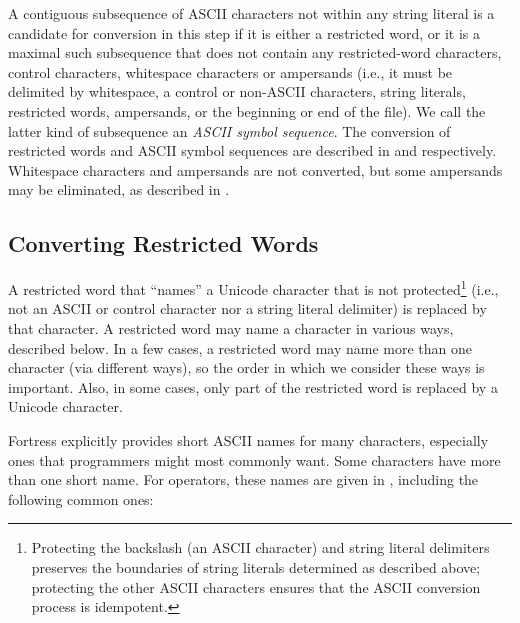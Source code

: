 A contiguous subsequence of ASCII characters
not within any string literal
is a candidate for conversion in this step
if it is either a restricted word,
or it is a maximal such subsequence
that does not contain any restricted-word characters,
control characters,
whitespace characters
or ampersands
(i.e., it must be delimited by whitespace,
a control or non-ASCII characters,
string literals,
restricted words,
ampersands,
or the beginning or end of the file).
We call the latter kind of subsequence
an \emph{ASCII symbol sequence}.
The conversion of restricted words and ASCII symbol sequences
are described in 
and  respectively.
Whitespace characters and ampersands are not converted,
but some ampersands may be eliminated,
as described in .


\subsection{Converting Restricted Words}

A restricted word that ``names'' a Unicode character
that is not protected\footnote{Protecting
the backslash (an ASCII character)
and string literal delimiters
preserves the boundaries of string literals
determined as described above;
protecting the other ASCII characters
ensures that the ASCII conversion process is idempotent.
}
(i.e., not an ASCII or control character
nor a string literal delimiter)
is replaced by that character.
A restricted word may name a character in various ways,
described below.
In a few cases,
a restricted word may name more than one character
(via different ways),
so the order in which we consider these ways is important.
Also,
in some cases,
only part of the restricted word is replaced by a Unicode character.

Fortress explicitly provides short ASCII names
for many characters,
especially ones that programmers might most commonly want.
Some characters have more than one short name.
For operators,
these names are given in ,
including the following common ones:

